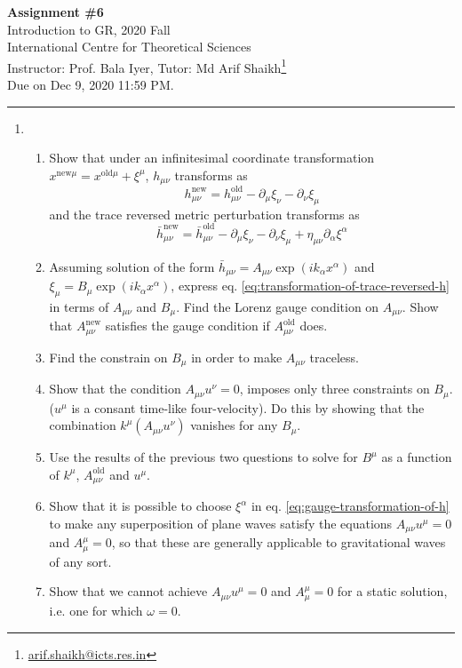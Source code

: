 \documentclass{article}
\begin{document}
\begin{center}
  {\bfseries Assignment \#6}\\
  Introduction to GR, 2020 Fall\\
  International Centre for Theoretical Sciences\\
  Instructor: Prof. Bala Iyer, Tutor: Md Arif Shaikh\footnote{\href{mailto: arif.shaikh@icts.res.in}{arif.shaikh@icts.res.in}}\\
  Due on Dec 9, 2020 11:59 PM.
\end{center}
\hrule

\begin{enumerate}
\item
  \begin{enumerate}
  \item Show that under an infinitesimal coordinate transformation
    $x^{\textrm{new}\mu} = x^{\textrm{old} \mu} + \xi^\mu$,
    $h_{\mu\nu}$ transforms as
    \begin{equation}
      \label{eq:gauge-transformation-of-h}
      h_{\mu\nu}^{\textrm{new}} = h^{\textrm{old}}_{\mu\nu} - \partial_\mu \xi_\nu - \partial_\nu \xi_\mu
    \end{equation}
    and the trace reversed metric perturbation transforms as
    \begin{equation}
      \label{eq:transformation-of-trace-reversed-h}
      \bar{h}_{\mu\nu}^{\textrm{new}} = \bar{h}^{\textrm{old}}_{\mu\nu} - \partial_\mu \xi_\nu - \partial_\nu \xi_\mu + \eta_{\mu\nu} \partial_\alpha \xi^\alpha
    \end{equation}
    
  \item Assuming solution of the form $\bar{h}_{\mu\nu} = A_{\mu\nu}\exp(ik_\alpha x^\alpha)$ and $\xi_\mu = B_\mu \exp(ik_\alpha x^\alpha)$, express eq. \ref{eq:transformation-of-trace-reversed-h} in terms of $A_{\mu\nu}$ and $B_\mu$. Find the Lorenz gauge condition on $A_{\mu\nu}$. Show that $A_{\mu\nu}^{\textrm{new}}$ satisfies the gauge condition if $A_{\mu\nu}^{\textrm{old}}$ does.
  \item Find the constrain on $B_\mu$ in order to make $A_{\mu\nu}$ traceless.
  \item Show that the condition $A_{\mu\nu}u^\nu = 0$, imposes only three constraints on $B_{\mu}$. ($u^\mu$ is a consant time-like four-velocity). Do this by showing that the combination $k^\mu (A_{\mu\nu}u^\nu)$ vanishes for any $B_{\mu}$.
  \item Use the results of the previous two questions to solve for $B^\mu$ as a function of $k^\mu$, $A_{\mu\nu}^{\textrm{old}}$ and $u^\mu$.
  \item Show that it is possible to choose $\xi^\alpha$ in eq. \ref{eq:gauge-transformation-of-h} to make any superposition of
    plane waves satisfy the equations $A_{\mu\nu}u^\mu = 0$ and $A^\mu_\mu = 0$, so that these are generally applicable to gravitational waves of any sort.
  \item Show that we cannot achieve $A_{\mu\nu}u^\mu = 0$ and $A^\mu_\mu = 0$ for a static solution, i.e. one for which $\omega = 0$.
  \end{enumerate}


\end{enumerate}
\end{document}
